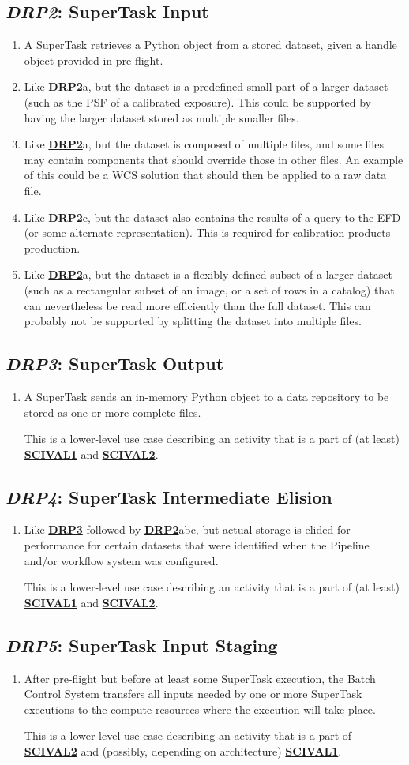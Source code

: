 \documentclass[DM,toc,lsstdraft]{lsstdoc}
\newcommand{\usecase}[3]{%
\subsection{\emph{#1}: #2}
\label{use:#1}
\begin{enumerate}[label=\alph*.]
#3
\end{enumerate}
}
\newcommand{\useref}[1]{\hyperref[use:#1]{\textcolor{lsstblue}{\textbf{#1}}}}
\begin{document}
\usecase{DRP2}{SuperTask Input}{%

\item
A SuperTask retrieves a Python object from a stored dataset, given a handle object provided in pre-flight.

\item
Like \useref{DRP2}a, but the dataset is a predefined small part of a larger dataset (such as the PSF of a calibrated exposure).
This could be supported by having the larger dataset stored as multiple smaller files.

\item
Like \useref{DRP2}a, but the dataset is composed of multiple files, and some files may contain components that should override those in other files.
An example of this could be a WCS solution that should then be applied to a raw data file.

\item
Like \useref{DRP2}c, but the dataset also contains the results of a query to the EFD (or some alternate representation).  This is required for calibration products production.

\item
Like \useref{DRP2}a, but the dataset is a flexibly-defined subset of a larger dataset (such as a rectangular subset of an image, or a set of rows in a catalog) that can nevertheless be read more efficiently than the full dataset.
This can probably not be supported by splitting the dataset into multiple files.
}

\usecase{DRP3}{SuperTask Output}{%

\item
A SuperTask sends an in-memory Python object to a data repository to be stored as one or more complete files.

This is a lower-level use case describing an activity that is a part of (at least) \useref{SCIVAL1} and \useref{SCIVAL2}.
}

\usecase{DRP4}{SuperTask Intermediate Elision}{%

\item
Like \useref{DRP3} followed by \useref{DRP2}abc, but actual storage is elided for performance for certain datasets that were identified when the Pipeline and/or workflow system was configured.

This is a lower-level use case describing an activity that is a part of (at least) \useref{SCIVAL1} and \useref{SCIVAL2}.
}

\usecase{DRP5}{SuperTask Input Staging}{%

\item
After pre-flight but before at least some SuperTask execution, the Batch Control System transfers all inputs needed by one or more SuperTask executions to the compute resources where the execution will take place.

This is a lower-level use case describing an activity that is a part of \useref{SCIVAL2} and (possibly, depending on architecture) \useref{SCIVAL1}.
}
\end{document}
